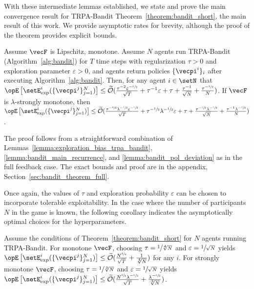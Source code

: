 With these intermediate lemmas established, we state and prove the main convergence result for TRPA-Bandit  Theorem~\ref{theorem:bandit_short}, the main result of this work.
We provide asymptotic rates for brevity, although the proof of the theorem provides explicit bounds.

\begin{theorem}\label{theorem:bandit_short}
Assume $\vecF$ is Lipschitz, monotone.
Assume $N$ agents run TRPA-Bandit (Algorithm~\ref{alg:bandit}) for $T$ time steps with regularization $\tau>0$ and exploration parameter $\varepsilon > 0$, and agents return policies $\{\vecpi^i\}_i$ after executing Algorithm~\ref{alg:bandit}.
Then, for any agent $i \in \setN$ that $\Exop\left[ \setE^i_{\text{exp}}( \{\vecpi^j\}_{j=1}^N ) \right] \leq \widetilde{\mathcal{O}} (\frac{\tau^{-2}\varepsilon^{-\sfrac{1}{2}}}{\sqrt{T}} + \tau^{-1}\varepsilon + \tau + \frac{\tau^{-1}}{\sqrt{N}} + \frac{\tau^{-\sfrac{3}{2}} }{N} )$.
If $\vecF$ is $\lambda$-strongly monotone, then $\Exop\left[ \setE^i_{\text{exp}}( \{\vecpi^j\}_{j=1}^N ) \right] \leq \widetilde{\mathcal{O}} (\frac{\tau^{-\sfrac{3}{2}} \lambda^{-\sfrac{1}{2}} \varepsilon^{-\sfrac{1}{2}}}{\sqrt{T}} + \tau^{-\sfrac{1}{2}} \lambda^{-\sfrac{1}{2}} \varepsilon + \tau + \frac{\tau^{-\sfrac{1}{2}} \lambda^{-\sfrac{1}{2}}}{\sqrt{N}} + \frac{\tau^{-1} \lambda^{-\sfrac{1}{2}} }{N} )$.
\end{theorem}
 The proof follows from a straightforward combination of Lemmas~\ref{lemma:exploration_bias_trpa_bandit}, \ref{lemma:bandit_main_recurrence}, and \ref{lemma:bandit_pol_deviation} as in the full feedback case.
The exact bounds and proof are in the appendix, Section~\ref{sec:bandit_theorem_full}.


Once again, the values of $\tau$ and exploration probability $\varepsilon$ can be chosen to incorporate tolerable exploitability.
In the case where the number of participants $N$ in the game is known, the following corollary indicates the asymptotically optimal choices for the hyperparameters.

\begin{corollary}\label{corollary:bandit}
Assume the conditions of Theorem~\ref{theorem:bandit_short} for $N$ agents running TRPA-Bandit.
For monotone $\vecF$, choosing $\tau = \sfrac{1}{\sqrt[4]{N}}$ and $\varepsilon = \sfrac{1}{\sqrt{N}}$ yields
$\Exop\left[\setE^i_{\text{exp}}(\{\vecpi^j\}_{j=1}^N) \right] \leq \widetilde{\mathcal{O}}(\frac{N^{\sfrac{3}{4}}}{\sqrt{T}} + \frac{1}{\sqrt[4]{N}})$ for any $i$.
For strongly monotone $\vecF$, choosing $\tau = \sfrac{1}{\sqrt[3]{N}}$ and $\varepsilon = \sfrac{1}{\sqrt{N}}$ yields $\Exop\left[\setE^i_{\text{exp}}(\{\vecpi^j\}_{j=1}^N) \right] \leq \widetilde{\mathcal{O}}(\frac{N^{\sfrac{3}{4}} \lambda^{-\sfrac{1}{2}}}{\sqrt{T}} + \frac{\lambda^{-\sfrac{1}{2}}}{\sqrt[3]{N}})$.
\end{corollary}


